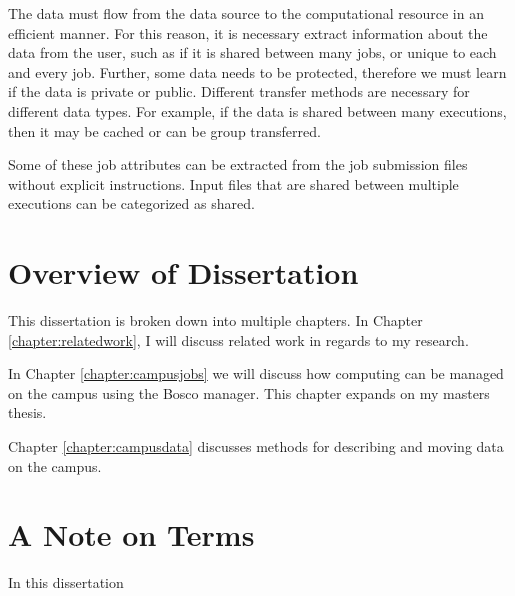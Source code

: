 The data must flow from the data source to the computational resource in an efficient manner.  For this reason, it is necessary extract information about the data from the user, such as if it is shared between many jobs, or unique to each and every job.  Further, some data needs to be protected, therefore we must learn if the data is private or public.  Different transfer methods are necessary for different data types.  For example, if the data is shared between many executions, then it may be cached or can be group transferred.  

Some of these job attributes can be extracted from the job submission files without explicit instructions.  Input files that are shared between multiple executions can be categorized as shared.


\section{Overview of Dissertation}

This dissertation is broken down into multiple chapters.  In Chapter \ref{chapter:relatedwork}, I will discuss related work in regards to my research.  

In Chapter \ref{chapter:campusjobs} we will discuss how computing can be managed on the campus using the Bosco manager.  This chapter expands on my masters thesis.

Chapter \ref{chapter:campusdata} discusses methods for describing and moving data on the campus.  



\section{A Note on Terms}

In this dissertation 

